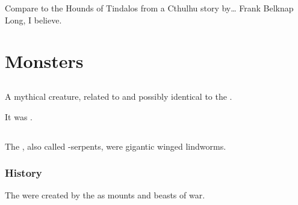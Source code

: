 Compare to the Hounds of Tindalos from a Cthulhu story by\ldots{} Frank Belknap Long, I believe. 























\chapter{Monsters}















\section{\Chimaera}
\index{\Chimaera}
A mythical creature, related to and possibly identical to the . 

It was . 















\section{\Carth}
\index{\carth}
The \carths, also called \carth-serpents, were gigantic winged lindworms. 









\subsection{History}
The \carths were created by the \ophidians as mounts and beasts of war. 









